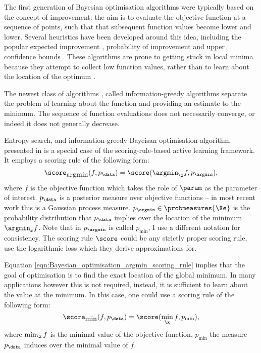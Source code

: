 The first generation of Bayesian optimisation algorithms were typically based on the concept of improvement: the aim is to evaluate the objective function at a sequence of points, such that that subsequent function values become lower and lower. Several heuristics have been developed around this idea, including the popular expected improvement \citep{Mockus1982,Jones1998, Frean2008}, probability of improvement \citep{Jones2001,Lizotte2008} and upper confidence bounds \citep{Srinivas2009}. These algorithms are prone to getting stuck in local minima because they attempt to collect low function values, rather than to learn about the location of the optimum \citep{Hennig2012entropy}.

The newest class of algorithms \citep{Hennig2012entropy}, called information-greedy algorithms separate the problem of learning about the function and providing an estimate to the minimum. The sequence of function evaluations does not necessarily converge, or indeed it does not generally decrease.

Entropy search, and information-greedy Bayeisan optimisation algorithm presented in \citep{Hennig2012entropy} is a special case of the scoring-rule-based active learning framework. It employs a scoring rule of the following form:
%
\begin{equation}
	\score_{\mbox{argmin}}(f,p_\data) = \score(\argmin_{\x}f,p_{\argmin}), \label{eqn:Bayesian_optimisation_argmin_scoring_rule}
\end{equation}
%
where $f$ is the objective function which takes the role of $\param$ as the parameter of interest. $p_\data$ is a posterior measure over objective functions -- in most recent work this is a Gaussian process measure. $p_{\argmin} \in \probmeasures{\Xe}$ is the probability distribution that $p_\data$ implies over the location of the minimum $\argmin_{x}f$. Note that in \citep{Hennig2012entropy} $p_{\argmin}$ is called $p_{\min}$, I use a different notation for consistency. The scoring rule $\score$ could be any strictly proper scoring rule, \citeauthor{Hennig2012entropy} use the logarithmic loss which they derive approximations for.

Equation \eqref{eqn:Bayesian_optimisation_argmin_scoring_rule} implies that the goal of optimisation is to find the exact location of the global minimum. In many applications however this is not required, instead, it is sufficient to learn about the value at the minimum. In this case, one could use a scoring rule of the following form:
%
\begin{equation}
	\score_{\mbox{min}}(f,p_\data) = \score(\min_{\x}f,p_{\min}), \label{eqn:Bayesian_optimisation_min_scoring_rule}
\end{equation}
%
where $\min_{\x}f$ is the minimal value of the objective function, $p_{\min}$ the measure $p_\data$ induces over the minimal value of $f$.

